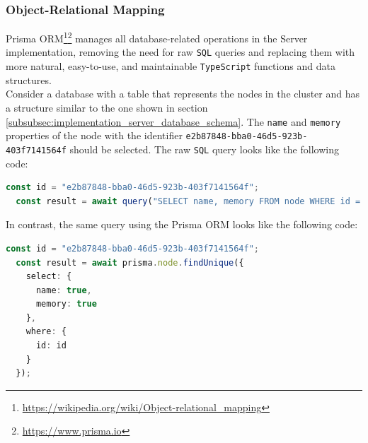 \subsubsection{Object-Relational Mapping}
\label{subsubsec:implementation_server_database_object_relational_mapping}

Prisma ORM\footnote{\url{https://wikipedia.org/wiki/Object-relational_mapping}}\footnote{\url{https://www.prisma.io}}
manages all database-related operations in the Server implementation, removing the
need for raw \texttt{SQL} queries and replacing them with more natural, easy-to-use,
and maintainable \texttt{TypeScript} functions and data structures. \\ %
Consider a database with a table that represents the nodes in the cluster and has
a structure similar to the one shown in section \ref{subsubsec:implementation_server_database_schema}.
The \texttt{name} and \texttt{memory} properties of the node with the identifier
\texttt{e2b87848-bba0-46d5-923b-403f7141564f} should be selected. The raw
\texttt{SQL} query looks like the following code:

\begin{lstlisting}[language=typescript, xleftmargin=\parindent, morekeywords={[2]{id, result}}, morekeywords={[3]{query}}, caption=Raw SQL query to retrieve the \texttt{name} and \texttt{memory} attributes of the node with the identifier \texttt{e2b87848-bba0-46d5-923b-403f7141564f}]
  const id = "e2b87848-bba0-46d5-923b-403f7141564f";
  const result = await query("SELECT name, memory FROM node WHERE id = $1", [id]);
\end{lstlisting}

In contrast, the same query using the Prisma ORM looks like the following code:

\begin{lstlisting}[language=typescript, xleftmargin=\parindent, morekeywords={[2]{id, result, prisma, node, select, name, memory, where}}, morekeywords={[3]{findUnique}}, caption=Prisma ORM query to retrieve the \texttt{name} and \texttt{memory} attributes of the node with the identifier \texttt{e2b87848-bba0-46d5-923b-403f7141564f}]
  const id = "e2b87848-bba0-46d5-923b-403f7141564f";
  const result = await prisma.node.findUnique({
    select: {
      name: true,
      memory: true
    },
    where: {
      id: id
    }
  });
\end{lstlisting}

